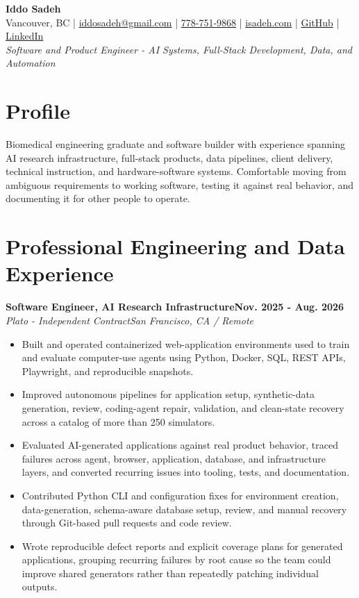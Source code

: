 \documentclass[10pt,letterpaper]{article}
\newenvironment{bullets}{\begin{itemize}[topsep=0.03cm,parsep=0pt,partopsep=0pt,itemsep=0.02cm,leftmargin=11pt]}{\end{itemize}}
\newcommand{\role}[4]{\needspace{3\baselineskip}\textbf{#1}\hfill\textbf{#2}\\[-1pt]\textit{#3}\hfill\textit{#4}\par}
\begin{document}
\begin{center}
{\fontsize{20pt}{22pt}\selectfont\textbf{Iddo Sadeh}}\\[3pt]
\small Vancouver, BC \;|\; \href{mailto:iddosadeh@gmail.com}{iddosadeh@gmail.com} \;|\; \href{tel:778-751-9868}{778-751-9868} \;|\; \href{https://isadeh.com}{isadeh.com} \;|\; \href{https://github.com/IddoSadeh}{GitHub} \;|\; \href{https://linkedin.com/in/iddo-s-092174166}{LinkedIn}\\[4pt]
\textit{Software and Product Engineer - AI Systems, Full-Stack Development, Data, and Automation}
\end{center}

\vspace{-2pt}
\section{Profile}
Biomedical engineering graduate and software builder with experience spanning AI research infrastructure, full-stack products, data pipelines, client delivery, technical instruction, and hardware-software systems. Comfortable moving from ambiguous requirements to working software, testing it against real behavior, and documenting it for other people to operate.

\section{Professional Engineering and Data Experience}
\role{Software Engineer, AI Research Infrastructure}{Nov. 2025 - Aug. 2026}{Plato - Independent Contract}{San Francisco, CA / Remote}
\begin{bullets}
\item Built and operated containerized web-application environments used to train and evaluate computer-use agents using Python, Docker, SQL, REST APIs, Playwright, and reproducible snapshots.
\item Improved autonomous pipelines for application setup, synthetic-data generation, review, coding-agent repair, validation, and clean-state recovery across a catalog of more than 250 simulators.
\item Evaluated AI-generated applications against real product behavior, traced failures across agent, browser, application, database, and infrastructure layers, and converted recurring issues into tooling, tests, and documentation.
\item Contributed Python CLI and configuration fixes for environment creation, data-generation, schema-aware database setup, review, and manual recovery through Git-based pull requests and code review.
\item Wrote reproducible defect reports and explicit coverage plans for generated applications, grouping recurring failures by root cause so the team could improve shared generators rather than repeatedly patching individual outputs.
\end{bullets}
\end{document}

